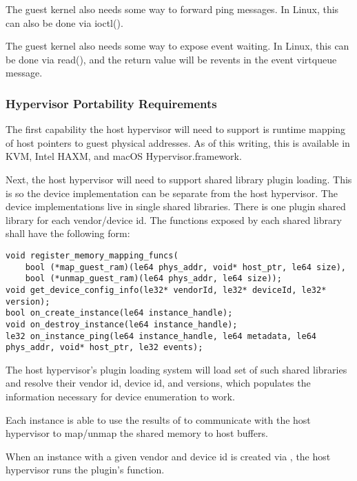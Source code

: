 The guest kernel also needs some way to forward ping messages.
In Linux, this can also be done via ioctl().

The guest kernel also needs some way to expose event waiting.
In Linux, this can be done via read(),
and the return value will be revents in the event virtqueue message.

\subsubsection{Hypervisor Portability Requirements}\label{sec:Device Types / User Device / Kernel and Hypervisor Portability Requirements / Kernel Portability Requirements}

The first capability the host hypervisor will need to support is runtime mapping of
host pointers to guest physical addresses.
As of this writing, this is available in KVM, Intel HAXM, and macOS Hypervisor.framework.

Next, the host hypervisor will need to support shared library plugin loading.
This is so the device implementation can be separate from the host hypervisor.
The device implementations live in single shared libraries.
There is one plugin shared library
for each vendor/device id.
The functions exposed by each shared library shall have the following form:

\begin{lstlisting}
void register_memory_mapping_funcs(
    bool (*map_guest_ram)(le64 phys_addr, void* host_ptr, le64 size),
    bool (*unmap_guest_ram)(le64 phys_addr, le64 size));
void get_device_config_info(le32* vendorId, le32* deviceId, le32* version);
bool on_create_instance(le64 instance_handle);
void on_destroy_instance(le64 instance_handle);
le32 on_instance_ping(le64 instance_handle, le64 metadata, le64 phys_addr, void* host_ptr, le32 events);
\end{lstlisting}

The host hypervisor's plugin loading system will load set of such shared libraries
and resolve their vendor id, device id, and versions,
which populates the information necessary for device enumeration to work.

Each instance is able to use the results of 
to communicate with the host hypervisor to map/unmap the shared memory
to host buffers.

When an instance with a given vendor and device id is created via
, the host hypervisor runs
the plugin's  function.

